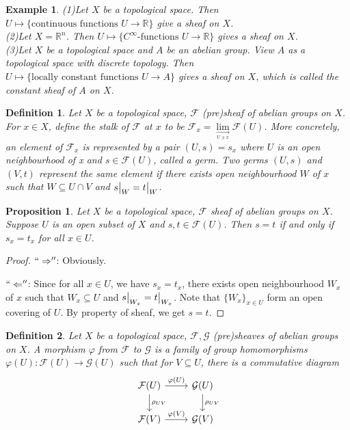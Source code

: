 \documentclass{ctexart}
\newtheorem{definition}{Definition}[section]
\newtheorem{proposition}{Proposition}[section]
\newtheorem{example}{Example}[section]
\newcommand{\leftquotes}{``}
\newcommand{\rightquotes}{''}
\begin{document}
\begin{example}
    (1)Let $X$ be a topological space.
    Then $U \longmapsto \{\text{continuous functions $U \longrightarrow \mathbb{R}$}\}$ give a sheaf on $X$. \\
    (2)Let $X = \mathbb{R}^{n}$.
    Then $U \longmapsto \{\text{$C^{\infty}$-functions $U \longrightarrow \mathbb{R}$}\}$ gives a sheaf on $X$. \\
    (3)Let $X$ be a topological space and $A$ be an abelian group.
    View $A$ as a topological space with discrete topology.
    Then $U \longmapsto \{\text{locally constant functions $U \longrightarrow A$}\}$ gives a sheaf on $X$, which is called the constant sheaf of $A$ on $X$.
\end{example}
\begin{definition}
    Let $X$ be a topological space, $\mathcal{F}$ (pre)sheaf of abelian groups on $X$.
    For $x\in X$, define the stalk of $\mathcal{F}$ at $x$ to be $\mathcal{F}_{x} = \underset{\underset{U\ni x}{\longrightarrow}}{\lim} \mathcal{F}(U)$.
    More concretely, an element of $\mathcal{F}_{x}$ is represented by a pair $(U, s) = s_{x}$ where $U$ is an open neighbourhood of x and $s\in \mathcal{F}(U)$, called a germ.
    Two germs $(U, s)$ and $(V, t)$ represent the same element if there exists open neighbourhood $W$ of $x$ such that $W \subseteq U \cap V$ and $s\big{|}_{W} = t\big{|}_{W}$.
\end{definition}
\begin{proposition}
    Let $X$ be a topological space, $\mathcal{F}$ sheaf of abelian groups on $X$.
    Suppose $U$ is an open subset of $X$ and $s,t\in \mathcal{F}(U)$.
    Then $s = t$ if and only if $s_{x} = t_{x}$ for all $x\in U$.
    \label{Proposition 1.5}
\end{proposition}
\begin{proof}
    $\leftquotes \Rightarrow \rightquotes$: Obviously.
    \par
    $\leftquotes \Leftarrow \rightquotes$: Since for all $x\in U$, we have $s_{x} = t_{x}$,
    there exists open neighbourhood $W_{x}$ of $x$ such that $W_{x} \subseteq U$ and $s\big{|}_{W_{x}} = t\big{|}_{W_{x}}$.
    Note that $\{W_{x}\}_{x\in U}$ form an open covering of $U$.
    By property of sheaf, we get $s = t$.
\end{proof}
\begin{definition}
    Let $X$ be a topological space, $\mathcal{F}, \mathcal{G}$ (pre)sheaves of abelian groups on $X$.
    A morphism $\varphi$ from $\mathcal{F}$ to $\mathcal{G}$ is a family of group homomorphisms $\varphi(U): \mathcal{F}(U) \longrightarrow \mathcal{G}(U)$ such that for $V \subseteq U$,
    there is a commutative diagram
    \begin{equation*}
        \begin{tikzcd}
            \mathcal{F}(U) \arrow[r, "\varphi(U)"] \arrow[d, "\rho_{UV}"] &
            \mathcal{G}(U) \arrow[d, "\rho_{UV}"] \\
            \mathcal{F}(V) \arrow[r, "\varphi(V)"] &
            \mathcal{G}(V)
        \end{tikzcd}
    \end{equation*}
\end{definition}
\end{document}
